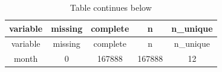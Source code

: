 \documentclass[]{book}
\theoremstyle{definition}
\theoremstyle{definition}
\theoremstyle{definition}
\theoremstyle{remark}
\begin{document}
\begin{longtable}[]{@{}ccccc@{}}
\caption{Table continues below}\tabularnewline
\toprule
\begin{minipage}[b]{0.13\columnwidth}\centering\strut
variable\strut
\end{minipage} & \begin{minipage}[b]{0.12\columnwidth}\centering\strut
missing\strut
\end{minipage} & \begin{minipage}[b]{0.13\columnwidth}\centering\strut
complete\strut
\end{minipage} & \begin{minipage}[b]{0.11\columnwidth}\centering\strut
n\strut
\end{minipage} & \begin{minipage}[b]{0.12\columnwidth}\centering\strut
n\_unique\strut
\end{minipage}\tabularnewline
\midrule
\endfirsthead
\toprule
\begin{minipage}[b]{0.13\columnwidth}\centering\strut
variable\strut
\end{minipage} & \begin{minipage}[b]{0.12\columnwidth}\centering\strut
missing\strut
\end{minipage} & \begin{minipage}[b]{0.13\columnwidth}\centering\strut
complete\strut
\end{minipage} & \begin{minipage}[b]{0.11\columnwidth}\centering\strut
n\strut
\end{minipage} & \begin{minipage}[b]{0.12\columnwidth}\centering\strut
n\_unique\strut
\end{minipage}\tabularnewline
\midrule
\endhead
\begin{minipage}[t]{0.13\columnwidth}\centering\strut
month\strut
\end{minipage} & \begin{minipage}[t]{0.12\columnwidth}\centering\strut
0\strut
\end{minipage} & \begin{minipage}[t]{0.13\columnwidth}\centering\strut
167888\strut
\end{minipage} & \begin{minipage}[t]{0.11\columnwidth}\centering\strut
167888\strut
\end{minipage} & \begin{minipage}[t]{0.12\columnwidth}\centering\strut
12\strut

\end{minipage}
\end{longtable}
\end{document}
